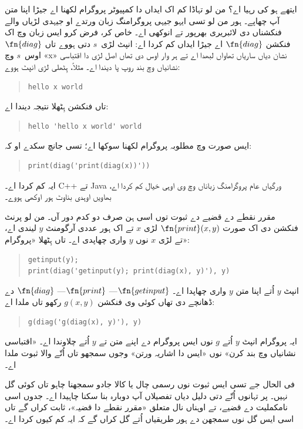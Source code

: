 \documentclass[../../../include/open-logic-section]{subfiles}
\begin{document}
\begin{explain}
ایتھے ہو کی رہیا
اے؟ من لو تہاڈا
کم اک ایداں دا
کمپیوٹر پروگرام
لکھنا اے جیڑا
اپنا متن آپ چھاپے۔
ہور من لو تسی
ایہو جیہی پروگرامنگ
زبان ورتدے او جیہدی
لڑیاں والے فنکشناں
دی لائبریری بھرپور
تے انوکھی اے۔
خاص کر، فرض کرو
ایس زبان وچ
اک فنکشن $\fn{diag}$
اے جیڑا ایداں کم
کردا اے: انپٹ
لڑی~$s$ دتی ہووے
تاں $\fn{diag}$ اوس~$s$ وچ «x» نشان
دیاں ساریاں تھاواں لبھدا اے تے ہر وار
اوس دی تھاں اصل لڑی دا اقتباسی
نشانیاں وچ بند روپ پا دیندا اے۔ مثلاً،
ہِٹھلی لڑی انپٹ
ہووے:
\begin{quote}
\begin{verbatim}
hello x world
\end{verbatim}
\end{quote}
تاں فنکشن ہِٹھلا
نتیجہ دیندا اے:
\begin{quote}
\begin{verbatim}
hello 'hello x world' world
\end{verbatim}
\end{quote}
ایس صورت وچ
مطلوبہ پروگرام
لکھنا سوکھا اے؛
تسی جانچ سکدے
او کہ:
\begin{quote}
\begin{verbatim}
print(diag('print(diag(x))'))
\end{verbatim}
\end{quote}
ایہ کم کردا اے۔
C++ تے Java
ورگیاں عام
پروگرامنگ زباناں
وچ وی اوہی خیال
کم کردا اے،
بھاویں اوہدی
بناوٹ ہور اوکھی
ہووے۔

مقرر نقطے دے
قضیے دے ثبوت
توں اسی ہن
صرف دو کدم
دور آں۔
من لو پرنٹ
فنکشن دی اک
صورت $\fn{print}(x,y)$
لڑی $x$ تے
اک ہور عددی
آرگومنٹ $y$
لیندی اے، تے
لڑی $x$ نوں
$y$ واری
چھاپدی اے۔
تاں ہِٹھلا
«پروگرام»:
\begin{quote}
\begin{verbatim}
getinput(y);
print(diag('getinput(y); print(diag(x), y)'), y)
\end{verbatim}
\end{quote}
انپٹ $y$ اُتے
اپنا متن $y$
واری چھاپدا
اے۔ $\fn{getinput}$---
$\fn{print}$---
$\fn{diag}$ دے
ڈھانچے دی تھاں
کوئی وی فنکشن
$g(x,y)$ رکھو
تاں ملدا اے:
\begin{quote}
\begin{verbatim}
g(diag('g(diag(x), y)'), y)
\end{verbatim}
\end{quote}
ایہ پروگرام
انپٹ $y$
اُتے $g$
نوں ایس پروگرام دے اپنے متن
تے $y$ اُتے
چلاوندا اے۔
«اقتباسی نشانیاں
وچ بند کرن»
نوں «ایس دا
اشاریہ ورتن»
وجوں سمجھو
تاں اُتّے
والا ثبوت
ملدا اے۔

فی الحال جے
تسی ایس ثبوت
نوں رسمی چال
یا کالا جادو
سمجھنا چاہو
تاں کوئی گل
نہیں۔ پر تہانوں اُتّے دتی دلیل دیاں
تفصیلاں آپ دوبارہ بنا سکنا چاہیدا اے۔
جدوں اسی
نامکملیت دے
قضیے، تے
اوہناں نال
متعلق «مقرر
نقطے دا قضیہ»،
ثابت کراں گے
تاں اسی ایس گل نوں سمجھن دے ہور
طریقیاں اُتے گل کراں گے کہ ایہ کم کیوں کردا اے۔
\end{explain}
\end{document}
